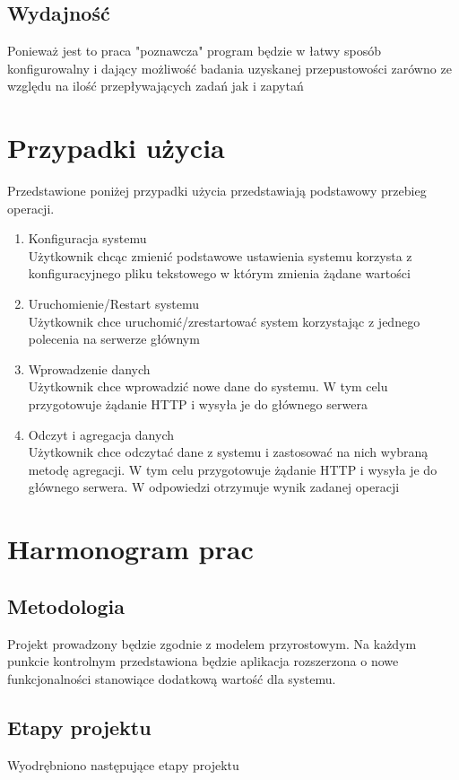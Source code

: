 \documentclass[paper=a4, fontsize=11pt]{scrartcl} %
\numberwithin{equation}{section} %
\numberwithin{figure}{section} %
\numberwithin{table}{section} %
\begin{document}
    \subsection{Wydajność}
    Ponieważ jest to praca "poznawcza" program będzie w łatwy sposób konfigurowalny i dający możliwość badania uzyskanej przepustowości zarówno ze względu na ilość przepływających zadań jak i zapytań
\section{Przypadki użycia}
    Przedstawione poniżej przypadki użycia przedstawiają podstawowy przebieg operacji.
    \begin{enumerate}
        \item Konfiguracja systemu
        \\Użytkownik chcąc zmienić podstawowe ustawienia systemu korzysta z konfiguracyjnego pliku tekstowego w którym
        zmienia żądane wartości
        \item Uruchomienie/Restart systemu
        \\Użytkownik chce uruchomić/zrestartować system korzystając z jednego polecenia na serwerze głównym
        \item Wprowadzenie danych
        \\Użytkownik chce wprowadzić nowe dane do systemu. W tym celu przygotowuje żądanie HTTP i wysyła je do
        głównego serwera
        \item Odczyt i agregacja danych
        \\Użytkownik chce odczytać dane z systemu i zastosować na nich wybraną metodę agregacji. W tym celu przygotowuje
        żądanie HTTP i wysyła je do głównego serwera. W odpowiedzi otrzymuje wynik zadanej operacji

    \end{enumerate}

\section{Harmonogram prac}
    \subsection{Metodologia}
    Projekt prowadzony będzie zgodnie z modelem przyrostowym. Na każdym punkcie kontrolnym przedstawiona będzie
    aplikacja rozszerzona o nowe funkcjonalności stanowiące dodatkową wartość dla systemu.

    \subsection{Etapy projektu}
    Wyodrębniono następujące etapy projektu
\end{document}
